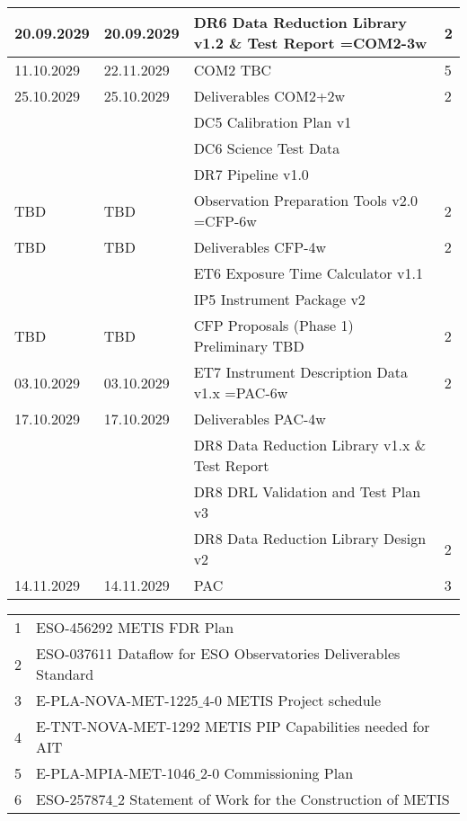 \begin{table}[h!]
\begin{tabularx}{\textwidth}{llll}
\hline
20.09.2029 & 20.09.2029 & DR6 Data Reduction Library v1.2 \& Test Report =COM2-3w	    &	2 \\
\hline
11.10.2029 & 22.11.2029 & COM2 TBC						                    & 5 \\
\hline
25.10.2029 & 25.10.2029 & Deliverables COM2+2w                              & 2 \\
   &           & DC5 Calibration Plan v1					                 &	\\
   &           & DC6 Science Test Data                                      &	\\
   &		    & DR7 Pipeline v1.0					                         &	\\
\hline
TBD    & TBD   & Observation Preparation Tools v2.0  =CFP-6w     	        & 2 \\
\hline
TBD	   & TBD   & Deliverables CFP-4w                                        & 2 \\
   &           & ET6 Exposure Time Calculator v1.1			                 &	\\
   &		    & IP5 Instrument Package v2				                     &	\\
\hline
TBD	   & TBD   & CFP Proposals (Phase 1) Preliminary  TBD		           & 2 \\
\hline
03.10.2029 & 03.10.2029 & ET7 Instrument Description Data v1.x =PAC-6w	   & 2 \\
\hline
17.10.2029 & 17.10.2029 & Deliverables PAC-4w                              &	\\
   &           & DR8 Data Reduction Library v1.x \& Test Report            &	\\
   &           & DR8 DRL Validation and Test Plan v3                       &	\\
   &           & DR8 Data Reduction Library Design v2			            & 2 \\
\hline
14.11.2029 & 14.11.2029 & PAC							                   & 3 \\
\hline\hline
\end{tabularx}			
\tiny
\begin{tabularx}{\textwidth}{ll}
1 & ESO-456292 METIS FDR Plan  \\
2 & ESO-037611 Dataflow for ESO Observatories Deliverables Standard \\
3 & E-PLA-NOVA-MET-1225$\_$4-0 METIS Project schedule \\
4 & E-TNT-NOVA-MET-1292 METIS PIP Capabilities needed for AIT \\ 
5 & E-PLA-MPIA-MET-1046$\_$2-0 Commissioning Plan \\
6 & ESO-257874$\_$2 Statement of Work for the Construction of METIS \\
\end{tabularx} 
\end{table}



